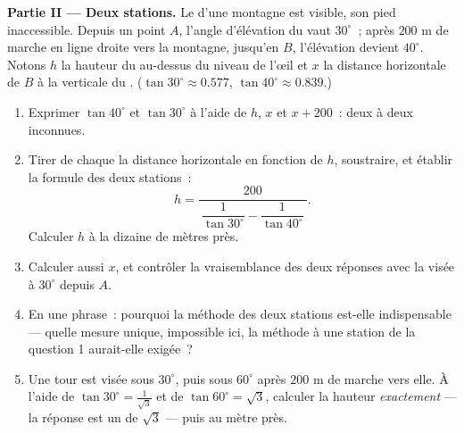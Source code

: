 \begin{problem}
\medskip
\noindent\textbf{Partie II --- Deux stations.}
Le  d'une montagne est visible, son pied inaccessible. Depuis
un point $A$, l'angle d'élévation du  vaut $30^\circ$~; après
$200$ m de marche en ligne droite vers la montagne, jusqu'en $B$,
l'élévation devient $40^\circ$. Notons $h$ la hauteur du 
au-dessus du niveau de l'œil et $x$ la distance horizontale de $B$ à
la verticale du . ($\tan 30^\circ \approx 0.577$,
$\tan 40^\circ \approx 0.839$.)
\begin{enumerate}[resume]
  \item Exprimer $\tan 40^\circ$ et $\tan 30^\circ$ à l'aide de $h$,
        $x$ et $x + 200$~: deux  à deux inconnues.
  \item Tirer de chaque  la distance horizontale en fonction
        de $h$, soustraire, et établir la formule des deux
        stations~:
        \[
        h = \frac{200}
        {\ \dfrac{1}{\tan 30^\circ} - \dfrac{1}{\tan 40^\circ}\ } .
        \]
        Calculer $h$ à la dizaine de mètres près.
  \item Calculer aussi $x$, et contrôler la vraisemblance des deux
        réponses avec la visée à $30^\circ$ depuis $A$.
  \item En une phrase~: pourquoi la méthode des deux stations
        est-elle indispensable --- quelle mesure unique, impossible
        ici, la méthode à une station de la question 1 aurait-elle
        exigée~?
  \item Une tour est visée sous $30^\circ$, puis sous $60^\circ$
        après $200$ m de marche vers elle. À l'aide de
        $\tan 30^\circ = \frac{1}{\sqrt3}$ et de
        $\tan 60^\circ = \sqrt3$, calculer la hauteur
        \emph{exactement} --- la réponse est un  de
        $\sqrt3$ --- puis au mètre près.
\end{enumerate}


\end{problem}
